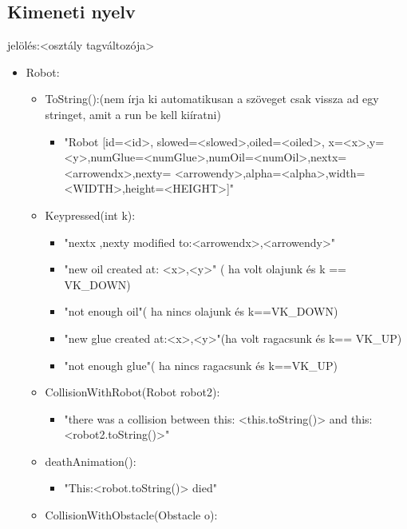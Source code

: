 \subsection{Kimeneti nyelv}
jelölés:<osztály tagváltozója>
\begin{itemize}
\item Robot: 
	\begin{itemize}
	\item ToString():(nem írja ki automatikusan a szöveget csak vissza ad egy stringet, amit a run be kell kiíratni)
	        \begin{itemize}
	\item "Robot [id=<id>,  slowed=<slowed>,oiled=<oiled>, x=<x>,y=<y>,numGlue=<numGlue>,numOil=<numOil>,nextx=<arrowendx>,nexty=
	        <arrowendy>,alpha=<alpha>,width=<WIDTH>,height=<HEIGHT>]" 
	        \end{itemize}
	\item Keypressed(int k):
	       \begin{itemize}
	        \item "nextx ,nexty modified to:<arrowendx>,<arrowendy>"
            \item "new oil created at: <x>,<y>" ( ha volt olajunk és k == VK\_DOWN)
            \item "not enough oil"( ha nincs olajunk és k==VK\_DOWN)
            \item "new glue created at:<x>,<y>"(ha volt ragacsunk és k== VK\_UP)
            \item "not enough glue"( ha nincs ragacsunk és k==VK\_UP)
        
	       \end{itemize}
	 \item CollisionWithRobot(Robot robot2):
	       	
	        \begin{itemize}
	        \item  "there was a collision between this: <this.toString()> and this: <robot2.toString()>"
	        
	        \end{itemize}
    \item deathAnimation():
	        \begin{itemize}
	        \item  "This:<robot.toString()> died"
	        
	        \end{itemize}
	 \item CollisionWithObstacle(Obstacle o):
	       	

\end{itemize}
\end{itemize}
